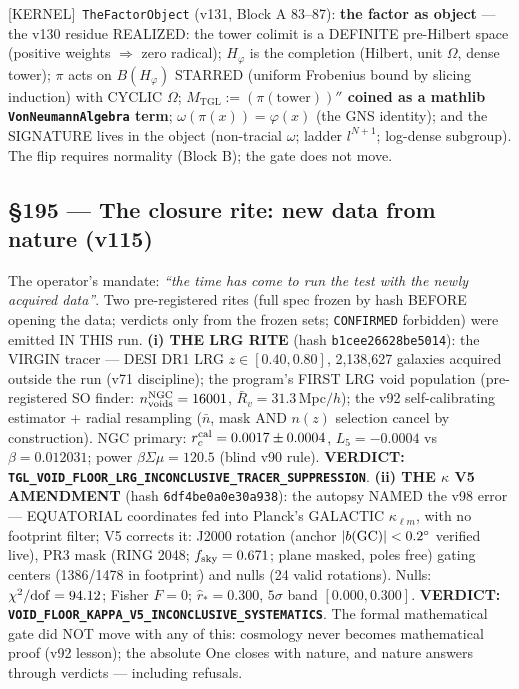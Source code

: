 \documentclass[11pt]{article}
\providecommand{\kernelmk}[1]{\textsf{[KERNEL]}~\texttt{#1}}\providecommand{\knownmk}[1]{\textsf{[KNOWN]}~{#1}}\providecommand{\statusmk}[1]{\textsf{[#1]}}
\theoremstyle{definition}\newtheorem{deriv}{Derivation}
\begin{document}
\kernelmk{TheFactorObject} (v131, Block A 83--87): \textbf{the factor as object} --- the v130 residue REALIZED: the tower colimit is a DEFINITE pre-Hilbert space (positive weights $\Rightarrow$ zero radical); $H_\varphi$ is the completion (Hilbert, unit $\Omega$, dense tower); $\pi$ acts on $B(H_\varphi)$ STARRED (uniform Frobenius bound by slicing induction) with CYCLIC $\Omega$; \textbf{$M_{\mathrm{TGL}}:=(\pi(\mathrm{tower}))''$ coined as a mathlib \texttt{VonNeumannAlgebra} term}; $\omega(\pi(x))=\varphi(x)$ (the GNS identity); and the SIGNATURE lives in the object (non-tracial $\omega$; ladder $l^{N+1}$; log-dense subgroup). The flip requires normality (Block B); the gate does not move.

\subsection*{\S195 --- The closure rite: new data from nature (v115)}The operator's mandate: \emph{``the time has come to run the test with the newly acquired data''}. Two pre-registered rites (full spec frozen by hash BEFORE opening the data; verdicts only from the frozen sets; \texttt{CONFIRMED} forbidden) were emitted IN THIS run. \textbf{(i) THE LRG RITE} (hash \texttt{b1cee26628be5014}): the VIRGIN tracer --- DESI DR1 LRG $z\in[0.40,0.80]$, 2,138,627 galaxies acquired outside the run (v71 discipline); the program's FIRST LRG void population (pre-registered SO finder: $n_{\rm voids}^{\rm NGC}=16001$, $\bar R_v=31.3$\,Mpc$/h$); the v92 self-calibrating estimator + radial resampling ($\bar n$, mask AND $n(z)$ selection cancel by construction). NGC primary: $r_c^{\rm cal}=0.0017\pm0.0004$, $L_5=-0.0004$ vs $\beta=0.012031$; power $\beta\Sigma\mu=120.5$ (blind v90 rule). \textbf{VERDICT: \texttt{TGL\_VOID\_FLOOR\_LRG\_INCONCLUSIVE\_TRACER\_SUPPRESSION}}. \textbf{(ii) THE $\kappa$ V5 AMENDMENT} (hash \texttt{6df4be0a0e30a938}): the autopsy NAMED the v98 error --- EQUATORIAL coordinates fed into Planck's GALACTIC $\kappa_{\ell m}$, with no footprint filter; V5 corrects it: J2000 rotation (anchor $|b({\rm GC})|<0.2^\circ$ verified live), PR3 mask (RING 2048; $f_{\rm sky}=0.671$; plane masked, poles free) gating centers (1386/1478 in footprint) and nulls (24 valid rotations). Nulls: $\chi^2/{\rm dof}=94.12$; Fisher $F=0$; $\hat r_*=0.300$, $5\sigma$ band $[0.000,0.300]$. \textbf{VERDICT: \texttt{VOID\_FLOOR\_KAPPA\_V5\_INCONCLUSIVE\_SYSTEMATICS}}. The formal mathematical gate did NOT move with any of this: cosmology never becomes mathematical proof (v92 lesson); the absolute One closes with nature, and nature answers through verdicts --- including refusals.
\end{document}
